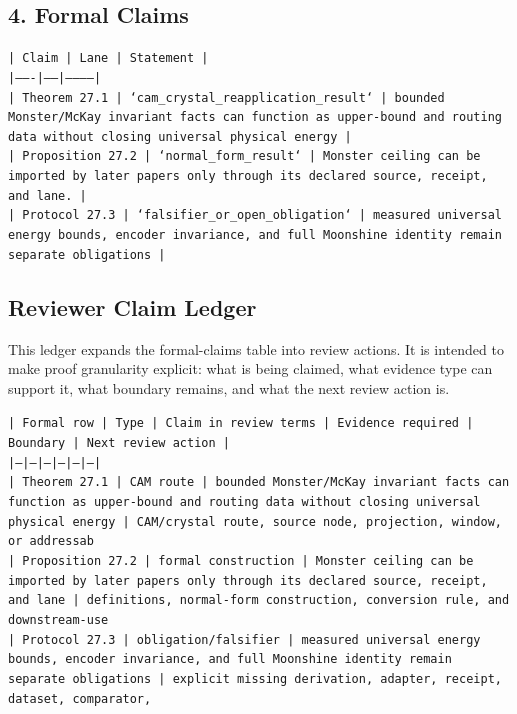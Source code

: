 \documentclass[11pt]{article}
\begin{document}
\subsection*{4. Formal Claims}

\noindent\texttt{| Claim | Lane | Statement |}\\
\noindent\texttt{|-------|------|-----------|}\\
\noindent\texttt{| Theorem 27.1 | `cam\_crystal\_reapplication\_result` | bounded Monster/McKay invariant facts can function as upper-bound and routing data without closing universal physical energy |}\\
\noindent\texttt{| Proposition 27.2 | `normal\_form\_result` | Monster ceiling can be imported by later papers only through its declared source, receipt, and lane. |}\\
\noindent\texttt{| Protocol 27.3 | `falsifier\_or\_open\_obligation` | measured universal energy bounds, encoder invariance, and full Moonshine identity remain separate obligations |}\\

\subsection*{Reviewer Claim Ledger}

This ledger expands the formal-claims table into review actions. It is intended to make proof granularity explicit: what is being claimed, what evidence type can support it, what boundary remains, and what the next review action is.

\noindent\texttt{| Formal row | Type | Claim in review terms | Evidence required | Boundary | Next review action |}\\
\noindent\texttt{|---|---|---|---|---|---|}\\
\noindent\texttt{| Theorem 27.1 | CAM route | bounded Monster/McKay invariant facts can function as upper-bound and routing data without closing universal physical energy | CAM/crystal route, source node, projection, window, or addressab}\\
\noindent\texttt{| Proposition 27.2 | formal construction | Monster ceiling can be imported by later papers only through its declared source, receipt, and lane | definitions, normal-form construction, conversion rule, and downstream-use }\\
\noindent\texttt{| Protocol 27.3 | obligation/falsifier | measured universal energy bounds, encoder invariance, and full Moonshine identity remain separate obligations | explicit missing derivation, adapter, receipt, dataset, comparator,}\\
\end{document}
